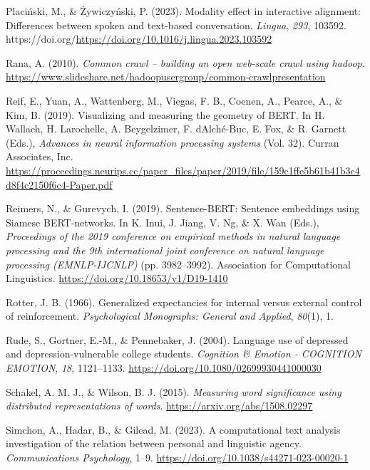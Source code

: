 \documentclass[
  man,
  floatsintext,
  longtable,
  nolmodern,
  notxfonts,
  notimes,
  colorlinks=true,linkcolor=blue,citecolor=blue,urlcolor=blue]{apa7}
\newlength{\cslhangindent}
\newenvironment{CSLReferences}[2] %
 {\begin{list}{}{%
  \setlength{\itemindent}{0pt}
  \setlength{\leftmargin}{0pt}
  \setlength{\parsep}{0pt}
  \ifodd #1
   \setlength{\leftmargin}{\cslhangindent}
   \setlength{\itemindent}{-1\cslhangindent}
  \fi
  \setlength{\itemsep}{#2\baselineskip}}}
 {\end{list}}
\begin{document}
\begin{CSLReferences}{1}{0}
Placiński, M., \& Żywiczyński, P. (2023). Modality effect in interactive
alignment: Differences between spoken and text-based conversation.
\emph{Lingua}, \emph{293}, 103592.
https://doi.org/\url{https://doi.org/10.1016/j.lingua.2023.103592}

Rana, A. (2010). \emph{Common crawl -- building an open web-scale crawl
using hadoop}.
\url{https://www.slideshare.net/hadoopusergroup/common-crawlpresentation}

Reif, E., Yuan, A., Wattenberg, M., Viegas, F. B., Coenen, A., Pearce,
A., \& Kim, B. (2019). Visualizing and measuring the geometry of BERT.
In H. Wallach, H. Larochelle, A. Beygelzimer, F. dAlché-Buc, E. Fox, \&
R. Garnett (Eds.), \emph{Advances in neural information processing
systems} (Vol. 32). Curran Associates, Inc.
\url{https://proceedings.neurips.cc/paper_files/paper/2019/file/159c1ffe5b61b41b3c4d8f4c2150f6c4-Paper.pdf}

Reimers, N., \& Gurevych, I. (2019). Sentence-{BERT}: Sentence
embeddings using {S}iamese {BERT}-networks. In K. Inui, J. Jiang, V. Ng,
\& X. Wan (Eds.), \emph{Proceedings of the 2019 conference on empirical
methods in natural language processing and the 9th international joint
conference on natural language processing (EMNLP-IJCNLP)} (pp.
3982--3992). Association for Computational Linguistics.
\url{https://doi.org/10.18653/v1/D19-1410}

Rotter, J. B. (1966). Generalized expectancies for internal versus
external control of reinforcement. \emph{Psychological Monographs:
General and Applied}, \emph{80}(1), 1.

Rude, S., Gortner, E.-M., \& Pennebaker, J. (2004). Language use of
depressed and depression-vulnerable college students. \emph{Cognition \&
Emotion - COGNITION EMOTION}, \emph{18}, 1121--1133.
\url{https://doi.org/10.1080/02699930441000030}

Schakel, A. M. J., \& Wilson, B. J. (2015). \emph{Measuring word
significance using distributed representations of words}.
\url{https://arxiv.org/abs/1508.02297}

Simchon, A., Hadar, B., \& Gilead, M. (2023). A computational text
analysis investigation of the relation between personal and linguistic
agency. \emph{Communications Psychology}, 1--9.
\url{https://doi.org/10.1038/s44271-023-00020-1}


\end{CSLReferences}
\end{document}

